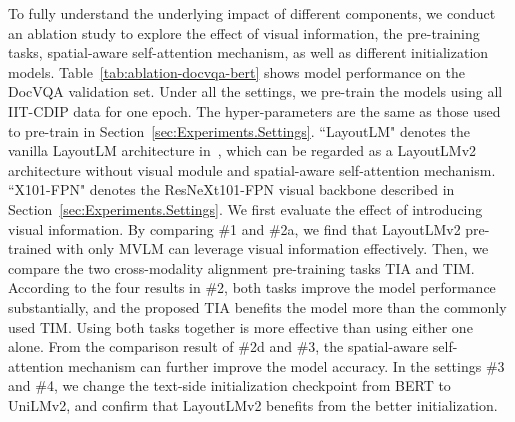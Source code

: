 \documentclass{article} \usepackage{iclr2021_conference,times}
\begin{document}
To fully understand the underlying impact of different components, we conduct an ablation study to explore the effect of visual information, the pre-training tasks, spatial-aware self-attention mechanism, as well as different initialization models. Table~\ref{tab:ablation-docvqa-bert} shows model performance on the DocVQA validation set. Under all the settings, we pre-train the models using all IIT-CDIP data for one epoch. The hyper-parameters are the same as those used to pre-train  in Section~\ref{sec:Experiments.Settings}. ``LayoutLM" denotes the vanilla LayoutLM architecture in~\citep{10.1145/3394486.3403172}, which can be regarded as a LayoutLMv2 architecture without visual module and spatial-aware self-attention mechanism. ``X101-FPN" denotes the ResNeXt101-FPN visual backbone described in Section~\ref{sec:Experiments.Settings}. We first evaluate the effect of introducing visual information. By comparing \#1 and \#2a, we find that LayoutLMv2 pre-trained with only MVLM can leverage visual information effectively. Then, we compare the two cross-modality alignment pre-training tasks TIA and TIM. According to the four results in \#2, both tasks improve the model performance substantially, and the proposed TIA benefits the model more than the commonly used TIM. Using both tasks together is more effective than using either one alone. From the comparison result of \#2d and \#3, the spatial-aware self-attention mechanism can further improve the model accuracy. In the settings \#3 and \#4, we change the text-side initialization checkpoint from BERT to UniLMv2, and confirm that LayoutLMv2 benefits from the better initialization.
\end{document}
